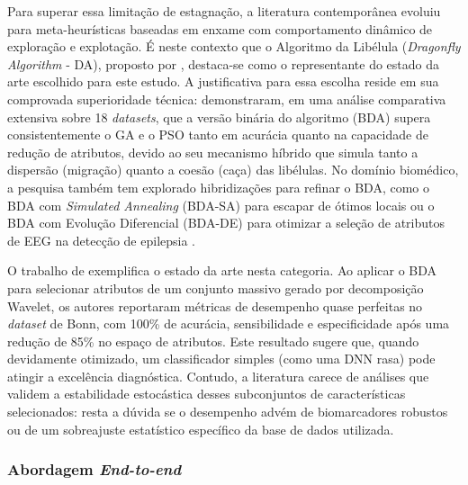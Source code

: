 \documentclass[alpha-refs,brazilian]{CC-EC_TF-TC}
\begin{document}
Para superar essa limitação de estagnação, a literatura contemporânea evoluiu para meta-heurísticas baseadas em enxame com comportamento dinâmico de exploração e explotação. É neste contexto que o Algoritmo da Libélula (\textit{Dragonfly Algorithm} - DA), proposto por \cite{Mirjalili2016}, destaca-se como o representante do estado da arte escolhido para este estudo. A justificativa para essa escolha reside em sua comprovada superioridade técnica: \cite{Mafarja2017} demonstraram, em uma análise comparativa extensiva sobre 18 \textit{datasets}, que a versão binária do algoritmo (BDA) supera consistentemente o GA e o PSO tanto em acurácia quanto na capacidade de redução de atributos, devido ao seu mecanismo híbrido que simula tanto a dispersão (migração) quanto a coesão (caça) das libélulas. No domínio biomédico, a pesquisa também tem explorado hibridizações para refinar o BDA, como o BDA com \textit{Simulated Annealing} (BDA-SA) para escapar de ótimos locais \citep{Chantar2021Hybrid} ou o BDA com Evolução Diferencial (BDA-DE) para otimizar a seleção de atributos de EEG na detecção de epilepsia \citep{AlGhamdi2024}.

O trabalho de \cite{Yogarajan2023} exemplifica o estado da arte nesta categoria. Ao aplicar o BDA para selecionar atributos de um conjunto massivo gerado por decomposição Wavelet, os autores reportaram métricas de desempenho quase perfeitas no \textit{dataset} de Bonn, com 100\% de acurácia, sensibilidade e especificidade após uma redução de 85\% no espaço de atributos. Este resultado sugere que, quando devidamente otimizado, um classificador simples (como uma DNN rasa) pode atingir a excelência diagnóstica. Contudo, a literatura carece de análises que validem a estabilidade estocástica desses subconjuntos de características selecionados: resta a dúvida se o desempenho advém de biomarcadores robustos ou de um sobreajuste estatístico específico da base de dados utilizada.

\subsubsection{Abordagem \textit{End-to-end}}
\end{document}
